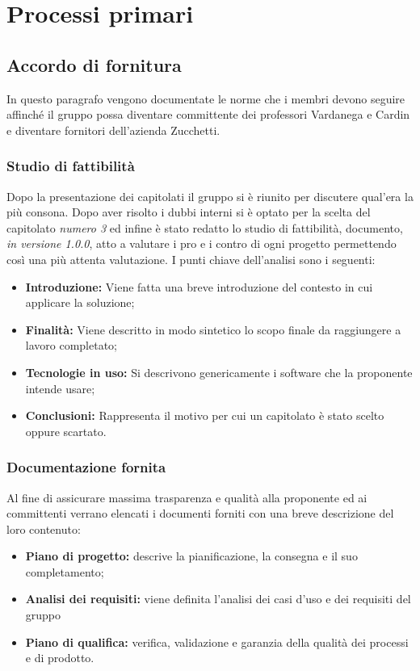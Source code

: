 \section{Processi primari}
    \subsection{Accordo di fornitura}
    	In questo paragrafo vengono documentate le norme che i membri devono seguire affinché il gruppo possa diventare committente dei professori Vardanega e Cardin e diventare fornitori dell'azienda Zucchetti.
    \subsubsection{Studio di fattibilità}
        Dopo la presentazione dei capitolati il gruppo si è riunito per discutere qual'era la più consona. Dopo aver risolto i dubbi interni si è optato per la scelta del capitolato \textit{numero 3} ed infine è stato redatto lo studio di fattibilità, documento, \textit{in versione 1.0.0},  atto a valutare i pro e i contro di ogni progetto permettendo così una più attenta valutazione. \newline
        I punti chiave dell'analisi sono i seguenti:
    	\begin{itemize}
		   \item \textbf{Introduzione:} Viene fatta una breve introduzione del contesto in cui applicare la soluzione;
		   \item \textbf{Finalità:} Viene descritto in modo sintetico lo scopo finale da raggiungere a lavoro completato;
		   \item \textbf{Tecnologie in uso:} Si descrivono genericamente i software che la proponente intende usare;
		   \item \textbf{Conclusioni:} Rappresenta il motivo per cui un capitolato è stato scelto oppure scartato.
	    \end{itemize}
    \subsubsection{Documentazione fornita}
	    Al fine di assicurare massima trasparenza e qualità alla proponente ed ai committenti verrano elencati i documenti forniti con una breve descrizione del loro contenuto:
    	\begin{itemize}
	        \item \textbf{Piano di progetto:} descrive la pianificazione, la consegna e il suo completamento;
	        \item \textbf{Analisi dei requisiti:} viene definita l'analisi dei casi d'uso e dei requisiti del gruppo
	        \item \textbf{Piano di qualifica:} verifica, validazione e garanzia della qualità dei processi e di prodotto.
	    \end{itemize}
    \newpage    
